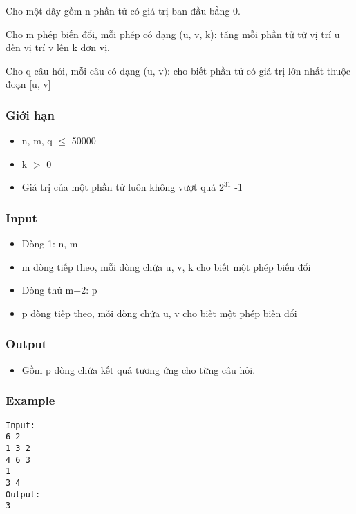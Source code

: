 



   Cho một dãy gồm n phần tử có giá trị ban đầu bằng 0.  

   Cho m phép biến đổi, mỗi phép có dạng (u, v, k): tăng mỗi phần tử từ vị trí u đến vị trí v lên k đơn vị.  

   Cho q câu hỏi, mỗi câu có dạng (u, v): cho biết phần tử có giá trị lớn nhất thuộc đoạn [u, v]  

\subsubsection{   Giới hạn  }
\begin{itemize}
	\item     n, m, q  $\le$  50000   
	\item     k $>$ 0   
	\item     Giá trị của một phần tử luôn không vượt quá $2^{31}$    -1   
\end{itemize}

\subsubsection{   Input  }
\begin{itemize}
	\item     Dòng 1: n, m   
	\item     m dòng tiếp theo, mỗi dòng chứa u, v, k cho biết một phép biến đổi   
	\item     Dòng thứ m+2: p   
	\item     p dòng tiếp theo, mỗi dòng chứa u, v cho biết một phép biến đổi    
\\
\end{itemize}

\subsubsection{   Output  }
\begin{itemize}
	\item     Gồm p dòng chứa kết quả tương ứng cho từng câu hỏi.   
\end{itemize}

\subsubsection{   Example  }
\begin{verbatim}
Input:
6 2
1 3 2
4 6 3
1
3 4
Output:
3
\end{verbatim}
